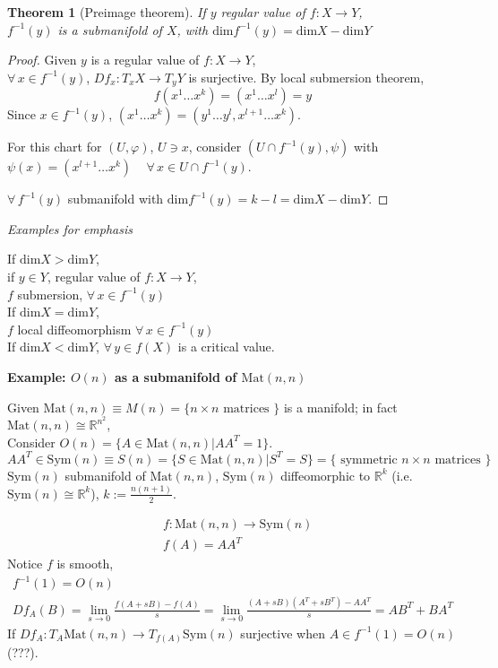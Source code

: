 \documentclass[10pt]{amsart}
\newtheorem{theorem}{Theorem}
\begin{document}
\begin{multicols*}{2}
\begin{theorem}[Preimage theorem]
If $y$ regular value of $f:X\to Y$, \\
$f^{-1}(y)$ is a submanifold of $X$, with $\text{dim}f^{-1}(y)=\text{dim}X - \text{dim}Y$
\end{theorem}
\begin{proof}
Given $y$ is a regular value of $f:X\to Y$,  \\
$\forall \, x \in f^{-1}(y)$, $Df_x:T_xX \to T_yY$ is surjective.  By local submersion theorem, 
\[
f(x^1 \dots x^k) = (x^1 \dots x^l)=y
\]	
Since $x\in f^{-1}(y)$, $(x^1\dots x^k)=(y^1 \dots y^l,x^{l+1}\dots x^k)$.  

For this chart for $(U,\varphi)$, $U\ni x$, consider $(U\cap f^{-1}(y),\psi)$ with $\psi(x) = (x^{l+1}\dots x^k) \quad \, \forall \, x\in U\cap f^{-1}(y)$.  

$\forall \, f^{-1}(y)$ submanifold with $\text{dim}f^{-1}(y) = k-l = \text{dim}X-\text{dim}Y$.  
	\end{proof}

\emph{Examples for emphasis}

If $\text{dim}X > \text{dim}Y$, \\
\phantom{\qquad \, } if $y\in Y$, regular value of $f:X\to Y$, \\
\phantom{\qquad \, \qquad \, } $f$ submersion, $\forall \, x \in f^{-1}(y)$ \\
If $\text{dim}X = \text{dim}Y$, \\
\phantom{\qquad \, } $f$ local diffeomorphism $\forall \, x\in f^{-1}(y)$ \\
If $\text{dim}X < \text{dim}Y$, $\forall \, y\in f(X)$ is a critical value.  


\textbf{Example: $O(n)$ as a submanifold of $\text{Mat}(n,n)$}

Given $\text{Mat}(n,n)\equiv M(n) = \lbrace n \times n \text{ matrices } \rbrace$ is a manifold; in fact $\text{Mat}(n,n) \cong \mathbb{R}^{n^2}$, \\
Consider $O(n) = \lbrace A \in \text{Mat}(n,n) | AA^T = 1\rbrace$.  
\begin{equation}
AA^T \in \text{Sym}(n) \equiv S(n) = \lbrace S\in \text{Mat}(n,n) | S^T = S \rbrace = \lbrace \text{ symmetric $n\times n$ matrices } \rbrace
\end{equation}
$\text{Sym}(n)$ submanifold of $\text{Mat}(n,n)$, $\text{Sym}(n)$ diffeomorphic to $\mathbb{R}^k$ (i.e. $\text{Sym}(n) \cong \mathbb{R}^k$), $k:= \frac{n (n+1)}{2}$.  

\[
\begin{aligned}
	& f:\text{Mat}(n,n) \to \text{Sym}(n) \\
	& f(A) = AA^T
\end{aligned}
\]
Notice $f$ is smooth, 
\[
\begin{gathered}
f^{-1}(1) = O(n) \\
Df_A(B) = \lim_{s\to 0} \frac{ f(A+sB) - f(A) }{s} = \lim_{s\to 0} \frac{(A+sB)(A^T + sB^T)- AA^T}{s} = AB^T +BA^T
\end{gathered}
\]
If $Df_A : T_A\text{Mat}(n,n) \to T_{f(A)}\text{Sym}(n)$ surjective when $A\in f^{-1}(1) = O(n)$ (???).  






\end{multicols*}
\end{document}
